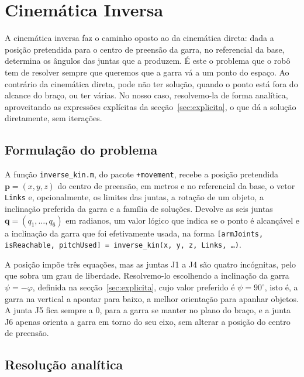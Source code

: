 \section{Cinemática Inversa}
\label{sec:inversa}


A cinemática inversa faz o caminho oposto ao da cinemática direta: dada a posição pretendida para o centro de preensão da garra, no referencial da base, determina os ângulos das juntas que a produzem. É este o problema que o robô tem de resolver sempre que queremos que a garra vá a um ponto do espaço. Ao contrário da cinemática direta, pode não ter solução, quando o ponto está fora do alcance do braço, ou ter várias. No nosso caso, resolvemo-la de forma analítica, aproveitando as expressões explícitas da secção~\ref{sec:explicita}, o que dá a solução diretamente, sem iterações.

\subsection{Formulação do problema}

A função \texttt{inverse\_kin.m}, do pacote \texttt{+movement}, recebe a posição pretendida $\mathbf{p}=(x,y,z)$ do centro de preensão, em metros e no referencial da base, o vetor \texttt{Links} e, opcionalmente, os limites das juntas, a rotação de um objeto, a inclinação preferida da garra e a família de soluções. Devolve as seis juntas $\mathbf{q}=(q_1,\dots,q_6)$ em radianos, um valor lógico que indica se o ponto é alcançável e a inclinação da garra que foi efetivamente usada, na forma \texttt{[armJoints, isReachable, pitchUsed] = inverse\_kin(x, y, z, Links, \dots)}.

A posição impõe três equações, mas as juntas J1 a J4 são quatro incógnitas, pelo que sobra um grau de liberdade. Resolvemo-lo escolhendo a inclinação da garra $\psi=-\varphi$, definida na secção~\ref{sec:explicita}, cujo valor preferido é $\psi=90^\circ$, isto é, a garra na vertical a apontar para baixo, a melhor orientação para apanhar objetos. A junta J5 fica sempre a $0$, para a garra se manter no plano do braço, e a junta J6 apenas orienta a garra em torno do seu eixo, sem alterar a posição do centro de preensão.

\subsection{Resolução analítica}

